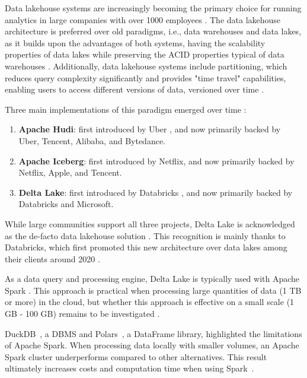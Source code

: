 Data lakehouse systems are increasingly becoming the primary choice for running analytics in large companies with over 1000 employees \cite{StateDataLakehouse2024}. The data lakehouse architecture \cite{lakehouse2021} is preferred over old paradigms, i.e., data warehouses and data lakes, as it builds upon the advantages of both systems, having the scalability properties of data lakes while preserving the \gls{ACID} properties typical of data warehouses \cite{lakehouse2021}. Additionally, data lakehouse systems include partitioning, which reduces query complexity significantly and provides "time travel" capabilities, enabling users to access different versions of data, versioned over time \cite{crociDataLakehouseHype2022}.

Three main implementations of this paradigm emerged over time \cite{ApacheHudiVs}: 
\begin{enumerate}
    \item \textbf{Apache Hudi}: first introduced by Uber \cite{rajaperumalUberEngineeringIncremental2017}, and now primarily backed by Uber, Tencent, Alibaba, and Bytedance.
    \item \textbf{Apache Iceberg}: first introduced by Netflix, and now primarily backed by Netflix, Apple, and Tencent.
    \item \textbf{Delta Lake}: first introduced by Databricks \cite{armbrustDeltaLakeHighperformance2020}, and now primarily backed by Databricks and Microsoft.
\end{enumerate}

While large communities support all three projects, Delta Lake is acknowledged as the de-facto data lakehouse solution \cite{ApacheHudiVs}. This recognition is mainly thanks to Databricks, which first promoted this new architecture over data lakes among their clients around 2020 \cite{armbrustDeltaLakeHighperformance2020}.

As a data query and processing engine, Delta Lake is typically used with Apache Spark \cite{zahariaApacheSparkUnified2016}. This approach is practical when processing large quantities of data (1 TB or more) in the cloud, but whether this approach is effective on a small scale (1 GB - 100 GB) remains to be investigated \cite{Khazanchi1801362}.

DuckDB~\cite{raasveldtDuckDBEmbeddableAnalytical2019}, a \gls{DBMS} and Polars~\cite{vinkWroteOneFastest2021}, a DataFrame library, highlighted the limitations of Apache Spark. When processing data locally with smaller volumes, an Apache Spark cluster underperforms compared to other alternatives. This result ultimately increases costs and computation time when using Spark~\cite{BenchmarkResultsSpark,ebergenUpdatesH2OAi2023}.


